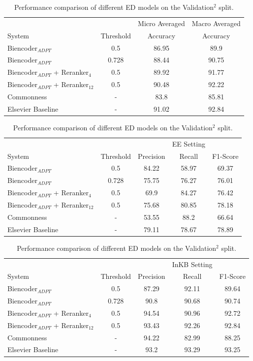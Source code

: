 \documentclass{report}
\theoremstyle{definition}
\theoremstyle{remark}
\begin{document}
\begin{table}
    \centering
    \begin{tabular}{lccc}
    &&Micro Averaged & Macro Averaged\\
    System    & Threshold & Accuracy &Accuracy \\
    \hline
    Biencoder$_{ADPT}$  & 0.5 & 86.95&89.9\\
    Biencoder$_{ADPT}$  & 0.728 & 88.44&90.75\\
    Biencoder$_{ADPT}$ + Reranker$_{4}$ & 0.5 & 89.92& 91.77\\
    Biencoder$_{ADPT}$ + Reranker$_{12}$ & 0.5 & 90.48 &92.22\\
    Commonness  & -  &83.8&85.81 \\
    Elsevier Baseline & - & 91.02&92.84\\
    \end{tabular}
    
    \vspace{0.5cm}\begin{tabular}{lcccc}
    &&&EE Setting & \\
    System    & Threshold & Precision & Recall & F1-Score \\
    \hline
    Biencoder$_{ADPT}$  & 0.5 & 84.22& 58.97&	69.37\\
    Biencoder$_{ADPT}$  & 0.728 & 75.75& 76.27&	76.01\\
    Biencoder$_{ADPT}$ + Reranker$_{4}$ & 0.5 & 69.9& 84.27& 76.42\\
    Biencoder$_{ADPT}$ + Reranker$_{12}$ & 0.5 & 75.68& 80.85& 78.18\\
    Commonness  & -  &53.55& 88.2&	66.64 \\
    Elsevier Baseline & - &79.11& 78.67&	78.89 \\
    \end{tabular}
    
    \vspace{0.5cm}\begin{tabular}{lcccc}
    &&&InKB Setting & \\
    System    & Threshold & Precision & Recall & F1-Score \\
    \hline
    Biencoder$_{ADPT}$  & 0.5 & 87.29&92.11&89.64\\
    Biencoder$_{ADPT}$  & 0.728 & 90.8&90.68&	90.74\\
    Biencoder$_{ADPT}$ + Reranker$_{4}$ & 0.5 &   94.54& 90.96& 92.72\\
    Biencoder$_{ADPT}$ + Reranker$_{12}$ & 0.5 & 93.43& 92.26& 92.84 \\
    Commonness  & - &94.22&82.99	&88.25 \\
    Elsevier Baseline & - & 93.2&93.29&	93.25\\
    \end{tabular}
       
    \caption{Performance comparison of different ED models on the Validation$^2$ split.}
    \label{tab:edresultsval}
\end{table}
\end{document}
